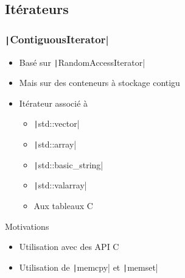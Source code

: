 \documentclass[C++.tex]{subfiles}
\begin{document}
\subsection*{Itérateurs}
\begin{frame}
	\frametitle{\texttt|ContiguousIterator|}
	\begin{itemize}
		\item Basé sur \texttt|RandomAccessIterator|
		\item Mais sur des conteneurs à stockage contigu
		\item Itérateur associé à 
		\begin{itemize}
			\item \texttt|std::vector|
			\item \texttt|std::array|
			\item \texttt|std::basic_string|
			\item \texttt|std::valarray|
			\item Aux tableaux C
		\end{itemize}
	\end{itemize}

	\begin{block}{Motivations}
		\begin{itemize}
			\item Utilisation avec des API C
			\item Utilisation  de \texttt|memcpy| et \texttt|memset|
		\end{itemize}
	\end{block}
\end{frame}
\end{document}
